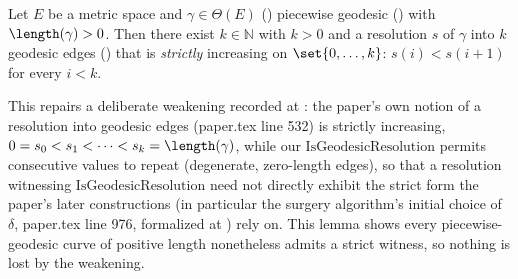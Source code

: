\begin{lemma}
  Let $E$ be a metric space and $\gamma \in \Theta(E)$ () piecewise geodesic
  () with $\length(\gamma) > 0$. Then there exist $k \in \mathbb{N}$
  with $k > 0$ and a resolution $s$ of $\gamma$ into $k$ geodesic edges
  () that is \emph{strictly} increasing on $\set{0,\dots,k}$:
  $s(i) < s(i+1)$ for every $i < k$.

  This repairs a deliberate weakening recorded at : the paper's own
  notion of a resolution into geodesic edges (paper.tex line 532) is strictly increasing,
  $0=s_0<s_1<\dots<s_k=\length(\gamma)$, while our $\mathrm{IsGeodesicResolution}$ permits
  consecutive values to repeat (degenerate, zero-length edges), so that a resolution witnessing
  $\mathrm{IsGeodesicResolution}$ need not directly exhibit the strict form the paper's later
  constructions (in particular the surgery algorithm's initial choice of $\delta$, paper.tex line
  976, formalized at ) rely on. This lemma shows every piecewise-geodesic
  curve of positive length nonetheless admits a strict witness, so nothing is lost by the
  weakening.
\end{lemma}
